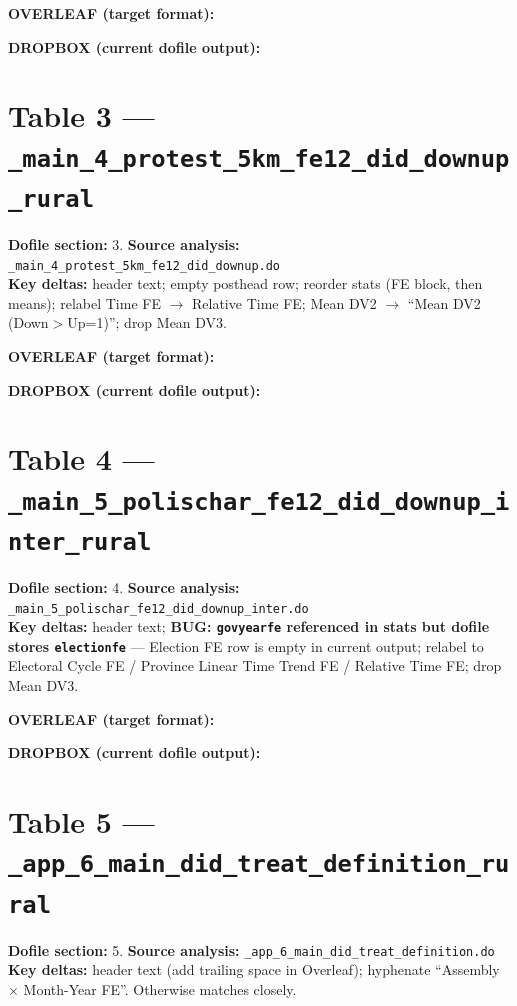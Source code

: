 \documentclass[10pt,landscape]{article}
\newcommand{\OV}[1]{%
  \begin{center}
    \colorbox{green!10}{\parbox{0.97\linewidth}{%
      \textbf{\textcolor{green!50!black}{OVERLEAF (target format):}}\par\vspace{0.3em}
      \centering #1
    }}
  \end{center}
}
\newcommand{\DB}[1]{%
  \begin{center}
    \colorbox{red!10}{\parbox{0.97\linewidth}{%
      \textbf{\textcolor{red!60!black}{DROPBOX (current dofile output):}}\par\vspace{0.3em}
      \centering #1
    }}
  \end{center}
}
\newcommand{\OVPATH}{/Users/anzony.quisperojas/Library/CloudStorage/Dropbox/Aplicaciones/Overleaf/sa_fires_politicians/tables}
\newcommand{\DBPATH}{/Users/anzony.quisperojas/Library/CloudStorage/Dropbox/sa_fires/proj_bureaucrats_farms/tex/paper/tables}
\begin{document}
\OV{}
\DB{}

\newpage

\section{Table 3 --- \texttt{\_main\_4\_protest\_5km\_fe12\_did\_downup\_rural}}
\noindent\textbf{Dofile section:} 3.\quad
\textbf{Source analysis:} \texttt{\_main\_4\_protest\_5km\_fe12\_did\_downup.do}\\
\textbf{Key deltas:} header text; empty posthead row; reorder stats (FE block, then means);
relabel Time FE $\rightarrow$ Relative Time FE;
Mean DV2 $\rightarrow$ ``Mean DV2 (Down$>$Up=1)''; drop Mean DV3.

\OV{}
\DB{}

\newpage

\section{Table 4 --- \texttt{\_main\_5\_polischar\_fe12\_did\_downup\_inter\_rural}}
\noindent\textbf{Dofile section:} 4.\quad
\textbf{Source analysis:} \texttt{\_main\_5\_polischar\_fe12\_did\_downup\_inter.do}\\
\textbf{Key deltas:} header text; \textbf{BUG: \texttt{govyearfe} referenced in stats but
dofile stores \texttt{electionfe}}
--- Election FE row is empty in current output;
relabel to Electoral Cycle FE / Province Linear Time Trend FE / Relative Time FE;
drop Mean DV3.

\OV{}
\DB{}

\newpage

\section{Table 5 --- \texttt{\_app\_6\_main\_did\_treat\_definition\_rural}}
\noindent\textbf{Dofile section:} 5.\quad
\textbf{Source analysis:} \texttt{\_app\_6\_main\_did\_treat\_definition.do}\\
\textbf{Key deltas:} header text (add trailing space in Overleaf); hyphenate
``Assembly $\times$ Month-Year FE''. Otherwise matches closely.
\end{document}
